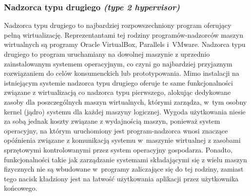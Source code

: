 \subsubsection{Nadzorca typu drugiego \textit{(type 2 hypervisor)}}
Nadzorca typu drugiego to najbardziej rozpowszechniony program oferujący pełną wirtualizację. Reprezentantami tej rodziny programów-nadzorców maszyn wirtualnych są programy Oracle VirtualBox, Parallels i~VMware. Nadzorca typu drugiego to program uruchamiany na dowolnej maszynie z uprzednio zainstalowanym systemem operacyjnym, co czyni go najbardziej przyjaznym rozwiązaniem do celów konsumenckich lub prototypowania. Mimo instalacji na istniejącym systemie nadzorca typu drugiego oferuje te same funkcjonalności związane z wirtualizacją co nadzorca typu pierwszego, alokując dedykowane zasoby dla poszczególnych maszyn wirtualnych, którymi zarządza, w~tym osobny kernel (jądro) systemu dla każdej maszyny logicznej. Wygoda użytkowania niesie za sobą jednak koszty związane z wydajnością maszyn, ponieważ system operacyjny, na którym uruchomiony jest program-nadzorca wnosi znaczące opóźnienia związane z komunikacją systemu w~maszynie wirtualnej z zasobami sprzętowymi kontrolowanymi przez system operacyjny gospodarza. Ponadto, funkcjonalności takie jak zarządzanie systemami składającymi się z wielu maszyn fizycznych nie są wbudowane w~programy zaliczające się do tej rodziny, zamiast tego nacisk kładziony jest na łatwość użytkowania aplikacji przez użytkownika końcowego.

